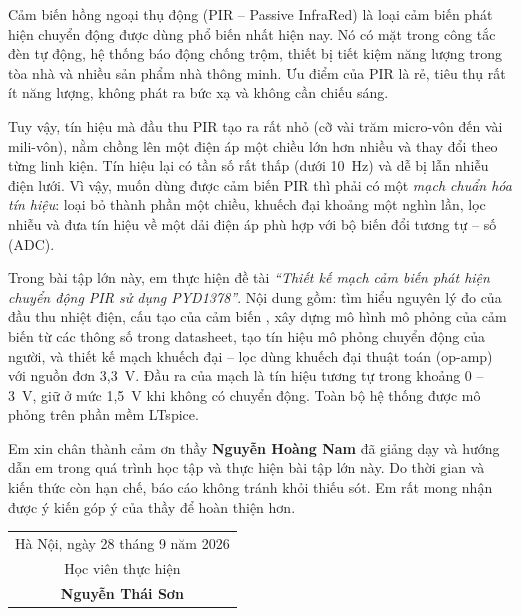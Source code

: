 
Cảm biến hồng ngoại thụ động (PIR -- Passive InfraRed) là loại cảm biến phát hiện chuyển động được dùng phổ biến nhất hiện nay. Nó có mặt trong công tắc đèn tự động, hệ thống báo động chống trộm, thiết bị tiết kiệm năng lượng trong tòa nhà và nhiều sản phẩm nhà thông minh. Ưu điểm của PIR là rẻ, tiêu thụ rất ít năng lượng, không phát ra bức xạ và không cần chiếu sáng.

Tuy vậy, tín hiệu mà đầu thu PIR tạo ra rất nhỏ (cỡ vài trăm micro-vôn đến vài mili-vôn), nằm chồng lên một điện áp một chiều lớn hơn nhiều và thay đổi theo từng linh kiện. Tín hiệu lại có tần số rất thấp (dưới 10~Hz) và dễ bị lẫn nhiễu điện lưới. Vì vậy, muốn dùng được cảm biến PIR thì phải có một \emph{mạch chuẩn hóa tín hiệu}: loại bỏ thành phần một chiều, khuếch đại khoảng một nghìn lần, lọc nhiễu và đưa tín hiệu về một dải điện áp phù hợp với bộ biến đổi tương tự -- số (ADC).

Trong bài tập lớn này, em thực hiện đề tài \emph{``Thiết kế mạch cảm biến phát hiện chuyển động PIR sử dụng PYD1378''}. Nội dung gồm: tìm hiểu nguyên lý đo của đầu thu nhiệt điện, cấu tạo của cảm biến \PYD{}, xây dựng mô hình mô phỏng của cảm biến từ các thông số trong datasheet, tạo tín hiệu mô phỏng chuyển động của người, và thiết kế mạch khuếch đại -- lọc dùng khuếch đại thuật toán (op-amp) với nguồn đơn 3,3~V. Đầu ra của mạch là tín hiệu tương tự trong khoảng 0 -- 3~V, giữ ở mức 1,5~V khi không có chuyển động. Toàn bộ hệ thống được mô phỏng trên phần mềm LTspice.

Em xin chân thành cảm ơn thầy \textbf{Nguyễn Hoàng Nam} đã giảng dạy và hướng dẫn em trong quá trình học tập và thực hiện bài tập lớn này. Do thời gian và kiến thức còn hạn chế, báo cáo không tránh khỏi thiếu sót. Em rất mong nhận được ý kiến góp ý của thầy để hoàn thiện hơn.

\vspace{1cm}
\begin{flushright}
\begin{tabular}{c}
Hà Nội, ngày 28 tháng 9 năm 2026\\
Học viên thực hiện\\[1.6cm]
\textbf{Nguyễn Thái Sơn}
\end{tabular}
\end{flushright}
